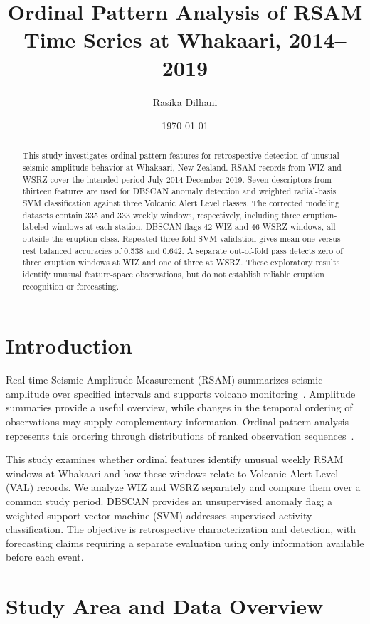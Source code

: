 \documentclass[11pt,a4paper]{article}
\title{Ordinal Pattern Analysis of RSAM Time Series at Whakaari, 2014--2019}
\author{Rasika Dilhani}
\date{\today}
\begin{document}
	\maketitle
	\begin{abstract}
		This study investigates ordinal pattern features for retrospective detection of unusual seismic-amplitude behavior at Whakaari, New Zealand. RSAM records from WIZ and WSRZ cover the intended period July 2014-December 2019. Seven descriptors from thirteen features are used for DBSCAN anomaly detection and weighted radial-basis SVM classification against three Volcanic Alert Level classes. The corrected modeling datasets contain 335 and 333 weekly windows, respectively, including three eruption-labeled windows at each station. DBSCAN flags 42 WIZ and 46 WSRZ windows, all outside the eruption class. Repeated three-fold SVM validation gives mean one-versus-rest balanced accuracies of 0.538 and 0.642. A separate out-of-fold pass detects zero of three eruption windows at WIZ and one of three at WSRZ. These exploratory results identify unusual feature-space observations, but do not establish reliable eruption recognition or forecasting.
	\end{abstract}
	
\section{Introduction}
Real-time Seismic Amplitude Measurement (RSAM) summarizes seismic amplitude over specified intervals and supports volcano monitoring~\cite{Endo1991}. Amplitude summaries provide a useful overview, while changes in the temporal ordering of observations may supply complementary information. Ordinal-pattern analysis represents this ordering through distributions of ranked observation sequences~\cite{Bandt2002}.

This study examines whether ordinal features identify unusual weekly RSAM windows at Whakaari and how these windows relate to Volcanic Alert Level (VAL) records. We analyze WIZ and WSRZ separately and compare them over a common study period. DBSCAN provides an unsupervised anomaly flag; a weighted support vector machine (SVM) addresses supervised activity classification. The objective is retrospective characterization and detection, with forecasting claims requiring a separate evaluation using only information available before each event.
	
\section{Study Area and Data Overview}\label{sec:data}
\end{document}
